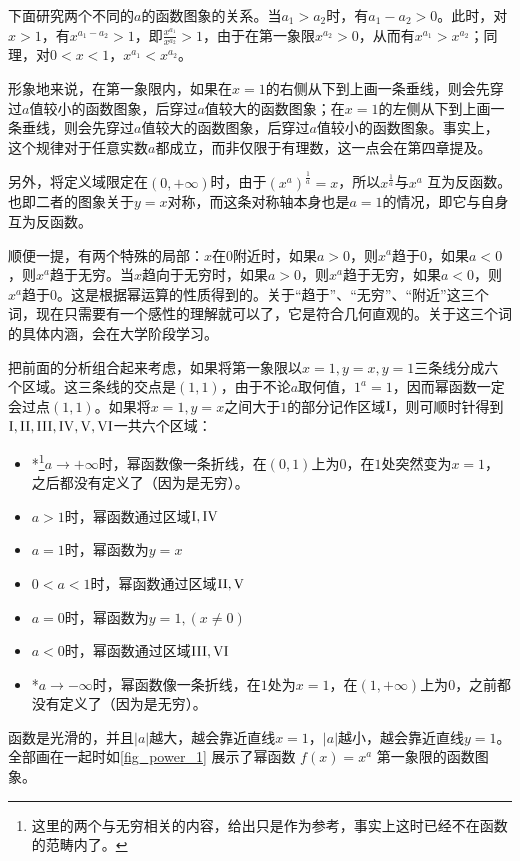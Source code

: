 下面研究两个不同的$a$的函数图象的关系。当$a_1>a_2$时，有$a_1-a_2>0$。此时，对$x>1$，有$x^{a_1-a_2}>1$，即$\displaystyle \frac{x^{a_1}}{x^{a_2}}>1$，由于在第一象限$x^{a_2}>0$，从而有$x^{a_1}>x^{a_2}$；同理，对$0<x<1$，$x^{a_1}<x^{a_2}$。

形象地来说，在第一象限内，如果在$x=1$的右侧从下到上画一条垂线，则会先穿过$a$值较小的函数图象，后穿过$a$值较大的函数图象；在$x=1$的左侧从下到上画一条垂线，则会先穿过$a$值较大的函数图象，后穿过$a$值较小的函数图象。事实上，这个规律对于任意实数$a$都成立，而非仅限于有理数，这一点会在第四章提及。

另外，将定义域限定在$(0,+\infty)$时，由于$\displaystyle(x^a)^{\frac{1}{a}}=x$，所以$\displaystyle x^{\frac{1}{a}}$与$x^a$ 互为反函数。也即二者的图象关于$y=x$对称，而这条对称轴本身也是$a=1$的情况，即它与自身互为反函数。

顺便一提，有两个特殊的局部：$x$在$0$附近时，如果$a>0$，则$x^a$趋于$0$，如果$a<0$，则$x^a$趋于无穷。当$x$趋向于无穷时，如果$a>0$，则$x^a$趋于无穷，如果$a<0$，则$x^a$趋于$0$。这是根据幂运算的性质得到的。关于“趋于”、“无穷”、“附近”这三个词，现在只需要有一个感性的理解就可以了，它是符合几何直观的。关于这三个词的具体内涵，会在大学阶段学习。

把前面的分析组合起来考虑，如果将第一象限以$x=1,y=x,y=1$三条线分成六个区域。这三条线的交点是$(1,1)$，由于不论$a$取何值，$1^a=1$，因而幂函数一定会过点$(1,1)$。如果将$x=1,y=x$之间大于$1$的部分记作区域$\rm{I}$，则可顺时针得到$\rm{I, II, III, IV, V, VI}$一共六个区域：
\begin{itemize}
\item *\footnote{这里的两个与无穷相关的内容，给出只是作为参考，事实上这时已经不在函数的范畴内了。}$a\to+\infty$时，幂函数像一条折线，在$(0,1)$上为$0$，在$1$处突然变为$x=1$，之后都没有定义了（因为是无穷）。
\item $a>1$时，幂函数通过区域$\rm{I,IV}$
\item $a=1$时，幂函数为$y=x$
\item $0<a<1$时，幂函数通过区域$\rm{II,V}$
\item $a=0$时，幂函数为$y=1,(x\neq0)$
\item $a<0$时，幂函数通过区域$\rm{III,VI}$
\item *$a\to-\infty$时，幂函数像一条折线，在$1$处为$x=1$，在$(1,+\infty)$上为$0$，之前都没有定义了（因为是无穷）。
\end{itemize}
函数是光滑的，并且$|a|$越大，越会靠近直线$x=1$，$|a|$越小，越会靠近直线$y=1$。全部画在一起时如\autoref{fig_power_1} 展示了幂函数 $f(x) = x^a$ 第一象限的函数图象。

